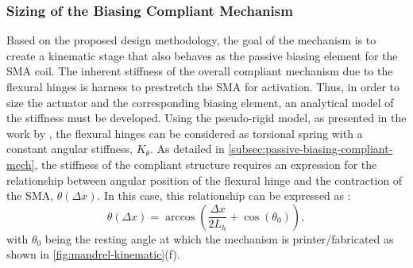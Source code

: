 \subsubsection{Sizing of the Biasing Compliant Mechanism}
Based on the proposed design methodology, the goal of the mechanism is to create a kinematic stage that also behaves as the passive biasing element for the SMA coil. The inherent stiffness of the overall compliant mechanism due to the flexural hinges is harness to prestretch the SMA for activation. Thus, in order to size the actuator and the corresponding biasing element, an analytical model of the stiffness must be developed. Using the pseudo-rigid model, as presented in the work by \cite{heneinConceptionStructuresArticulees2005}, the flexural hinges can be considered as torsional spring with a constant angular stiffness, $K_\theta$. As detailed in \cref{subsec:passive-biasing-compliant-mech}, the stiffness of the compliant structure requires an expression for the relationship between angular position of the flexural hinge and the contraction of the SMA, $\theta(\Delta x)$. In this case, this relationship can be expressed as :
\begin{equation}\label{eq:mandrel-theta-model}
\theta(\Delta x) = \arccos{\left(\frac{\Delta x}{2L_{h}} + \cos(\theta_0)\right)},
\end{equation}
with $\theta_0$ being the resting angle at which the mechanism is printer/fabricated as shown in \cref{fig:mandrel-kinematic}(f).

